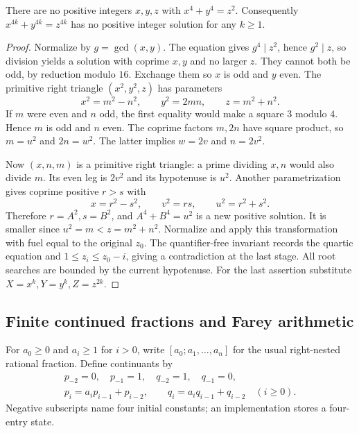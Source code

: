 \begin{theorem}\label{dio:fermat-four}
There are no positive integers $x,y,z$ with $x^4+y^4=z^2$.
Consequently $x^{4k}+y^{4k}=z^{4k}$ has no positive integer solution
for any $k\geq1$.
\end{theorem}
\begin{proof}
Normalize by $g=\gcd(x,y)$. The equation gives $g^4\mid z^2$,
hence $g^2\mid z$, so division yields a solution with coprime $x,y$
and no larger $z$. They cannot both be odd, by reduction modulo $16$.
Exchange them so $x$ is odd and $y$ even.
The primitive right triangle $(x^2,y^2,z)$ has parameters
\[
 x^2=m^2-n^2,\qquad y^2=2mn,\qquad z=m^2+n^2.
\]
If $m$ were even and $n$ odd, the first equality would make a square
$3$ modulo $4$. Hence $m$ is odd and $n$ even.
The coprime factors $m,2n$ have square product, so $m=u^2$ and
$2n=w^2$. The latter implies $w=2v$ and $n=2v^2$.

Now $(x,n,m)$ is a primitive right triangle: a prime dividing $x,n$
would also divide $m$. Its even leg is $2v^2$ and its hypotenuse is
$u^2$. Another parametrization gives coprime positive $r>s$ with
\[
 x=r^2-s^2,\qquad v^2=rs,\qquad u^2=r^2+s^2.
\]
Therefore $r=A^2,s=B^2$, and $A^4+B^4=u^2$ is a new positive
solution. It is smaller since $u^2=m<z=m^2+n^2$.
Normalize and apply this transformation with fuel equal to the original
$z_0$. The quantifier-free invariant records the quartic equation and
$1\leq z_i\leq z_0-i$, giving a contradiction at the last stage.
All root searches are bounded by the current hypotenuse.
For the last assertion substitute $X=x^k,Y=y^k,Z=z^{2k}$.
\end{proof}

\subsection{Finite continued fractions and Farey arithmetic}

For $a_0\geq0$ and $a_i\geq1$ for $i>0$, write
$[a_0;a_1,\ldots,a_n]$ for the usual right-nested rational fraction.
Define continuants by
\[
 \begin{gathered}
 p_{-2}=0,\quad p_{-1}=1,\quad
 q_{-2}=1,\quad q_{-1}=0,\\
 p_i=a_ip_{i-1}+p_{i-2},\qquad
 q_i=a_iq_{i-1}+q_{i-2}\quad(i\geq0).
 \end{gathered}
\]
Negative subscripts name four initial constants; an implementation
stores a four-entry state.

